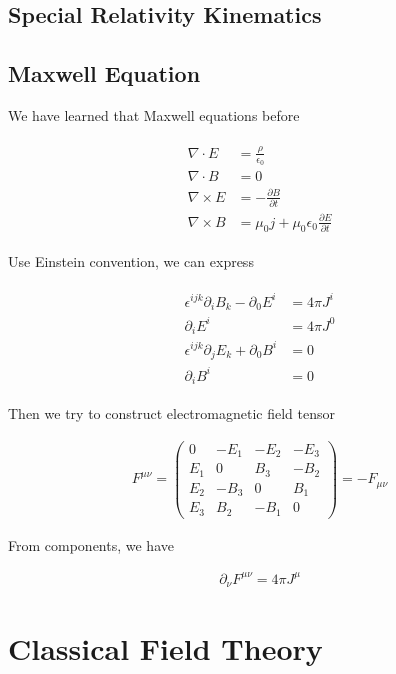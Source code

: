 \subsection{Special Relativity Kinematics}

\subsection{Maxwell Equation}

We have learned that Maxwell equations before

\begin{align}
    \begin{aligned}
        \nabla \cdot E &=\frac{\rho}{\epsilon_{0}}\\
        \nabla\cdot B&=0\\
        \nabla \times E&=-\frac{\partial B}{\partial t}\\
        \nabla \times B&=\mu_{0}j+\mu_{0}\epsilon_{0}\frac{\partial E}{\partial t}
    \end{aligned}
\end{align}

Use Einstein convention, we can express

\begin{align}
    \begin{aligned}
        \epsilon^{ijk}\partial_{i}B_{k}-\partial_{0}E^{i}&=4\pi J^{i}\\
        \partial_{i}E^{i}&=4\pi J^{0}\\
        \epsilon^{ijk}\partial_{j}E_{k}+\partial_{0}B^{i}&=0\\
        \partial_{i}B^{i}&=0
    \end{aligned}
\end{align}

Then we try to construct electromagnetic field tensor

\begin{align}
    F^{\mu\nu}=\begin{pmatrix}
    0 & -E_{1} &-E_{2}  &-E_{3} \\
    E_{1} & 0 & B_{3} & -B_{2}\\
    E_{2} & -B_{3} &  0& B_{1}\\
    E_{3} & B_{2} & -B_{1} &0 
    \end{pmatrix}=-F_{\mu\nu}
\end{align}

From components, we have 

\begin{align}
    \partial_{\nu}F^{\mu\nu}=4\pi J^{\mu}
\end{align}

\section{Classical Field Theory}




